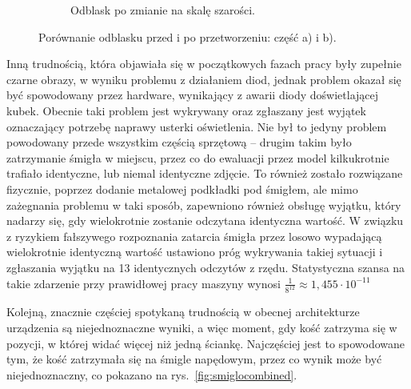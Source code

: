 \begin{figure}[H]
\begin{subfigure}[t]{0.45\linewidth}
        \caption{Odblask po zmianie na skalę szarości.}
        \label{fig:blaskproc}
    \end{subfigure}
    \caption{Porównanie odblasku przed i po przetworzeniu: część a) i b).}
    \label{fig:blaskcombined}
\end{figure}


Inną trudnością, która objawiała się w początkowych fazach pracy były zupełnie czarne obrazy,
w wyniku problemu z działaniem diod, jednak problem okazał się być spowodowany przez hardware, wynikający z awarii diody doświetlającej kubek.
Obecnie taki problem jest wykrywany oraz zgłaszany jest wyjątek oznaczający potrzebę naprawy usterki oświetlenia.
Nie był to jedyny problem powodowany przede wszystkim częścią sprzętową -- drugim takim było zatrzymanie śmigła w miejscu,
przez co do ewaluacji przez model kilkukrotnie trafiało identyczne, lub niemal identyczne zdjęcie.
To również zostało rozwiązane fizycznie, poprzez dodanie metalowej podkładki pod śmigłem,
ale mimo zażegnania problemu w taki sposób, zapewniono również obsługę wyjątku, który nadarzy się, gdy wielokrotnie zostanie odczytana identyczna wartość.
W związku z ryzykiem fałszywego rozpoznania zatarcia śmigła przez losowo wypadającą wielokrotnie identyczną wartość ustawiono próg wykrywania takiej sytuacji i zgłaszania wyjątku na 13 identycznych odczytów z rzędu.
Statystyczna szansa na takie zdarzenie przy prawidłowej pracy maszyny wynosi
$\frac{1}{8^{12}} \approx 1{,}455 \cdot 10^{-11}$

Kolejną, znacznie częściej spotykaną trudnością w obecnej architekturze urządzenia są niejednoznaczne wyniki,
a więc moment, gdy kość zatrzyma się w pozycji, w której widać więcej niż jedną ściankę.
Najczęściej jest to spowodowane tym, że kość zatrzymała się na śmigle napędowym,
przez co wynik może być niejednoznaczny, co pokazano na rys.~\ref{fig:smiglocombined}.

